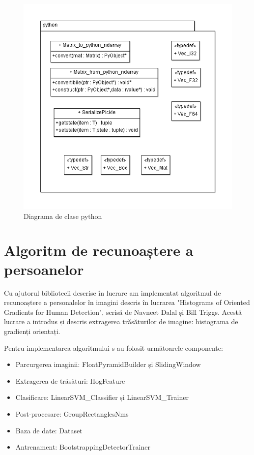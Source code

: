 \begin{figure}[H]
	\centering
		\includegraphics[width=1.00\textwidth]{uml/PythonClassDiagram.png}
	\caption{Diagrama de clase python}
	\label{fig:PythonClassDiagram}
\end{figure}




\pagebreak
\section{Algoritm de recunoaștere a persoanelor}

Cu ajutorul bibliotecii descrise în lucrare am implementat algoritmul de recunoaștere a personalelor în imagini descris în lucrarea "Histograms of Oriented Gradients for Human Detection", scrisă de Navneet Dalal și Bill Triggs\cite{Dalal05histogramsof}.
Acestă lucrare a introdus și descris extragerea trăsăturilor de imagine: histograma de gradienți orientați.

Pentru implementarea algoritmului s-au folosit următoarele componente:
\begin{itemize}
	\item Parcurgerea imaginii: FloatPyramidBuilder și SlidingWindow
	\item Extragerea de trăsături: HogFeature
	\item Clasificare: LinearSVM\_Classifier și LinearSVM\_Trainer
	\item Post-procesare: GroupRectanglesNms
	\item Baza de date: Dataset
	\item Antrenament: BootstrappingDetectorTrainer
\end{itemize}

